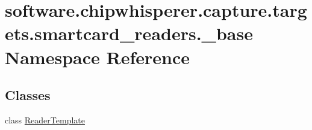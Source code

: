 \hypertarget{namespacesoftware_1_1chipwhisperer_1_1capture_1_1targets_1_1smartcard__readers_1_1__base}{}\section{software.\+chipwhisperer.\+capture.\+targets.\+smartcard\+\_\+readers.\+\_\+base Namespace Reference}
\label{namespacesoftware_1_1chipwhisperer_1_1capture_1_1targets_1_1smartcard__readers_1_1__base}
\subsection*{Classes}
\begin{DoxyCompactItemize}
\item 
class \hyperlink{classsoftware_1_1chipwhisperer_1_1capture_1_1targets_1_1smartcard__readers_1_1__base_1_1ReaderTemplate}{Reader\+Template}
\end{DoxyCompactItemize}
